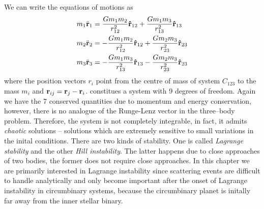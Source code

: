 We can write the equations of motions as
\begin{equation}
\begin{aligned}
    m_1\ddot{\boldsymbol{\mathbf{r}}}_1&= \frac{Gm_1m_2}{r^2_{12}} \boldsymbol{\mathbf{\hat r}}_{12}+
    \frac{Gm_1m_3}{r^2_{13}} \boldsymbol{\mathbf{\hat r}}_{13}\\
    m_2\ddot{\boldsymbol{\mathbf{r}}}_2&= -\frac{Gm_1m_2}{r^2_{12}} \boldsymbol{\mathbf{\hat r}}_{12}+
    \frac{Gm_2m_3}{r^2_{23}} \boldsymbol{\mathbf{\hat r}}_{23}\\
    m_3\ddot{\boldsymbol{\mathbf{r}}}_3&= -\frac{Gm_1m_3}{r^2_{13}} \boldsymbol{\mathbf{\hat r}}_{13}-
    \frac{Gm_2m_3}{r^2_{23}} \boldsymbol{\mathbf{\hat r}}_{23}
\label{eq:three_body_newton}
\end{aligned}
\end{equation}
where the position vectors $r_i$ point from the centre of mass of 
system $C_{123}$ to the mass $m_i$ and $\boldsymbol{\mathbf{r}}_{ij}=\boldsymbol{\mathbf{r}}_j-\boldsymbol{\mathbf{r}}_i$. 
 constitues a system with 9 degrees of freedom.
Again we have the 7 conserved quantities due to momentum and energy 
conservation, however, there is no analogue of the Runge-Lenz vector
in the three--body problem. Therefore, the system is not completely
integrable, in fact, it admits \emph{chaotic} solutions -- solutions which
are extremely sensitive to small variations in the inital conditions. 
There are two kinds of stability. One is called \emph{Lagrange stability} 
and the other \emph{Hill instability}. The latter happens due to close
approaches of two bodies, the former does not require close approaches.
In this chapter we are primarily interested in Lagrange instability 
since scattering events are difficult to handle analytically
and only become important after the onset of Lagrange instability in 
circumbinary systems, because the circumbinary planet is initally far away
from the inner stellar binary.

